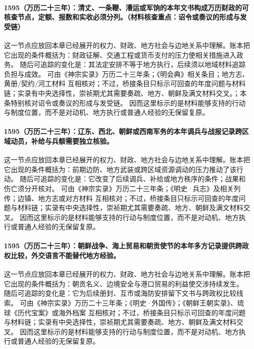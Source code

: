\paragraph{1595（万历二十三年）：清丈、一条鞭、漕运或军饷的本年文书构成万历财政的可核查节点，定额、报数和实收必须分列。（材料核查重点：诏令或奏议的形成与发受链）} 这一节点应放回本章已经展开的权力、财政、地方社会与边地关系中理解。账本把它出现的条件概括为：财政征解、交通工程或货币支付的压力使相关措施进入政务。 随后可追踪的变化是：其法定安排不等于地方执行，后续须以地域材料追踪负担与成效。 可由《神宗实录》万历二十三年条；《明会典》相关条目；地方志、黄册/契约/河工材料 互相核对；不过，桥接条目只标示可回查的年度问题与材料链；实录有中央选择性，崇祯期尤其需要奏疏、地方、朝鲜及满文材料交叉。；本条特别核对诏令或奏议的形成与发受链。 因而这里标示的是材料能够支持的行动与制度位置，而不是对动机、地方执行或普通人经验的无保留复原。

\paragraph{1595（万历二十三年）：辽东、西北、朝鲜或西南军务的本年调兵与战报记录跨区域动员，补给与兵额需要独立核验。} 这一节点应放回本章已经展开的权力、财政、地方社会与边地关系中理解。账本把它出现的条件概括为：前期边防、地方武装或跨区域资源调动的压力推动了该行动。 随后可追踪的变化是：它改变了后续调兵、补给或地方秩序的条件；战果和伤亡须分开核对。 可由《神宗实录》万历二十三年条；《明史·兵志》及相关列传；边镇、地方志或对方材料 互相核对；不过，桥接条目只标示可回查的年度问题与材料链；实录有中央选择性，崇祯期尤其需要奏疏、地方、朝鲜及满文材料交叉。 因而这里标示的是材料能够支持的行动与制度位置，而不是对动机、地方执行或普通人经验的无保留复原。

\paragraph{1595（万历二十三年）：朝鲜战争、海上贸易和朝贡使节的本年多方记录提供跨政权比较，外交语言不能替代地方经验。} 这一节点应放回本章已经展开的权力、财政、地方社会与边地关系中理解。账本把它出现的条件概括为：朝贡名义、边境安全与港口贸易的利益使交涉持续发生。 随后可追踪的变化是：它为后续册封、互市或海防安排留下文书与跨政权比较线索。 可由《神宗实录》万历二十三年条；《明史·外国传》；《朝鲜王朝实录》、琉球《历代宝案》或海外档案 互相核对；不过，桥接条目只标示可回查的年度问题与材料链；实录有中央选择性，崇祯期尤其需要奏疏、地方、朝鲜及满文材料交叉。 因而这里标示的是材料能够支持的行动与制度位置，而不是对动机、地方执行或普通人经验的无保留复原。

